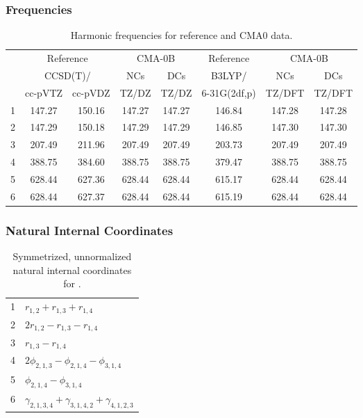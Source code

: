 \documentclass[10pt,oneside]{article}
\begin{document}
\clearpage

\subsubsection*{Frequencies}
\begin{table}[h!]
\centering
\caption{Harmonic frequencies for reference and CMA0 data.}
\begin{tabular}{cccccccc}
\toprule
{} & \multicolumn{2}{c}{Reference} & \multicolumn{2}{c}{CMA-0B} &    Reference & \multicolumn{2}{c}{CMA-0B} \\
{} & \multicolumn{2}{c}{CCSD(T)/} &    NCs &    DCs &       B3LYP/ &    NCs &    DCs \\
{} &   cc-pVTZ & cc-pVDZ &  TZ/DZ &  TZ/DZ & 6-31G(2df,p) & TZ/DFT & TZ/DFT \\
\midrule
1 &    147.27 &  150.16 & 147.27 & 147.27 &       146.84 & 147.28 & 147.28 \\
2 &    147.29 &  150.18 & 147.29 & 147.29 &       146.85 & 147.30 & 147.30 \\
3 &    207.49 &  211.96 & 207.49 & 207.49 &       203.73 & 207.49 & 207.49 \\
4 &    388.75 &  384.60 & 388.75 & 388.75 &       379.47 & 388.75 & 388.75 \\
5 &    628.44 &  627.36 & 628.44 & 628.44 &       615.17 & 628.44 & 628.44 \\
6 &    628.44 &  627.37 & 628.44 & 628.44 &       615.19 & 628.44 & 628.44 \\
\bottomrule
\end{tabular}
\end{table}

\clearpage

\subsubsection*{Natural Internal Coordinates}
\begin{table}[h!]
\centering
\caption{Symmetrized, unnormalized natural internal coordinates for .}
\small
\begin{tabular}{ll}
  1   & $r_{1,2} + r_{1,3} + r_{1,4}$ \\
  2   & $2r_{1,2} - r_{1,3} - r_{1,4}$ \\
  3   & $r_{1,3} - r_{1,4}$ \\
  4   & $2\phi_{2,1,3} - \phi_{2,1,4} - \phi_{3,1,4}$ \\
  5   & $\phi_{2,1,4} - \phi_{3,1,4}$ \\
  6   & $\gamma_{2,1,3,4} + \gamma_{3,1,4,2} + \gamma_{4,1,2,3}$ \\
\end{tabular}
\end{table}
\end{document}
